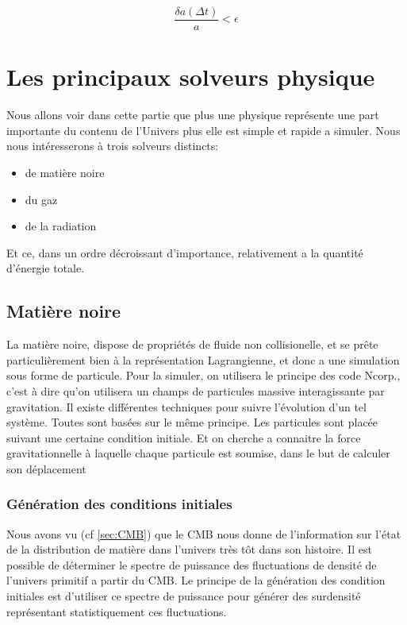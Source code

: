 \begin{equation}
\frac{\delta a (\Delta t) } {a} < \epsilon
\end{equation}


\chapter{Les principaux solveurs physique}

Nous allons voir dans cette partie que plus une physique représente une part importante du contenu de l'Univers plus elle est simple et rapide a simuler.
Nous nous intéresserons à trois solveurs distincts:
\begin{itemize}
\item de matière noire
\item du gaz
\item de la radiation
\end{itemize}
Et ce, dans un ordre décroissant d'importance, relativement a la quantité d'énergie totale.

\section{Matière noire}
\label{sec:solverDM}
La matière noire, dispose de propriétés de fluide non collisionelle, et se prête particulièrement bien à la représentation Lagrangienne, et donc a une simulation sous forme de particule.
Pour la simuler, on utilisera le principe des code Ncorp., c'est à dire qu'on utilisera un champs de particules massive interagissante par gravitation.
Il existe différentes techniques pour suivre l'évolution d'un tel système.
Toutes sont basées sur le même principe.
Les particules sont placée suivant une certaine condition initiale.
Et on cherche a connaitre la force gravitationnelle à laquelle chaque particule est soumise, dans le but de calculer son déplacement

\subsection{Génération des conditions initiales}
\label{sec:IC}
Nous avons vu (cf \ref{sec:CMB}) que le \ac{CMB} nous donne de l'information sur l'état de la distribution de matière dans l'univers très tôt dans son histoire.
Il est possible de déterminer le spectre de puissance des fluctuations de densité de l'univers primitif a partir du \ac{CMB}.
Le principe de la génération des condition initiales est d'utiliser ce spectre de puissance pour générer des surdensité représentant statistiquement ces fluctuations.

